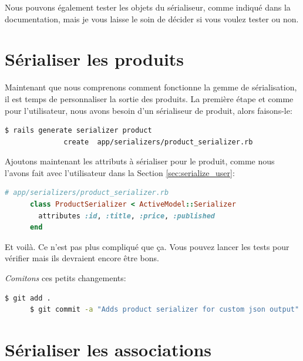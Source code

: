\documentclass[]{report}
\begin{document}
    Nous pouvons également tester les objets du sérialiseur, comme indiqué dans la documentation, mais je vous laisse le soin de décider si vous voulez tester ou non.

  \section{Sérialiser les produits}

    Maintenant que nous comprenons comment fonctionne la gemme de sérialisation, il est temps de personnaliser la sortie des produits. La première étape et comme pour l'utilisateur, nous avons besoin d'un sérialiseur de produit, alors faisons-le:

    \begin{scriptsize}
      \begin{lstlisting}[language=bash]
      $ rails generate serializer product
              create  app/serializers/product_serializer.rb
      \end{lstlisting}
    \end{scriptsize}

    Ajoutons maintenant les attributs à sérialiser pour le produit, comme nous l'avons fait avec l'utilisateur dans la Section \ref{sec:serialize_user}:

    \begin{scriptsize}
      \begin{lstlisting}[language=ruby]
      # app/serializers/product_serializer.rb
      class ProductSerializer < ActiveModel::Serializer
        attributes :id, :title, :price, :published
      end
      \end{lstlisting}
    \end{scriptsize}

    Et voilà. Ce n'est pas plus compliqué que ça. Vous pouvez lancer les tests pour vérifier mais ils devraient encore être bons.

    \textit{Comitons} ces petits changements:

    \begin{scriptsize}
      \begin{lstlisting}[language=bash]
      $ git add .
      $ git commit -a "Adds product serializer for custom json output"
      \end{lstlisting}
    \end{scriptsize}

  \section{Sérialiser les associations}
\end{document}
